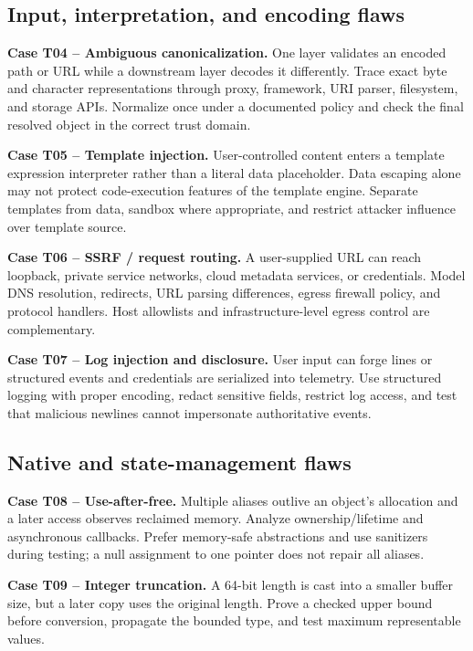 \documentclass[
  letterpaper,
]{article}
\begin{document}
\subsection{Input, interpretation, and encoding
flaws}\label{input-interpretation-and-encoding-flaws}

\textbf{Case T04 -- Ambiguous canonicalization.} One layer validates an
encoded path or URL while a downstream layer decodes it differently.
Trace exact byte and character representations through proxy, framework,
URI parser, filesystem, and storage APIs. Normalize once under a
documented policy and check the final resolved object in the correct
trust domain.

\textbf{Case T05 -- Template injection.} User-controlled content enters
a template expression interpreter rather than a literal data
placeholder. Data escaping alone may not protect code-execution features
of the template engine. Separate templates from data, sandbox where
appropriate, and restrict attacker influence over template source.

\textbf{Case T06 -- SSRF / request routing.} A user-supplied URL can
reach loopback, private service networks, cloud metadata services, or
credentials. Model DNS resolution, redirects, URL parsing differences,
egress firewall policy, and protocol handlers. Host allowlists and
infrastructure-level egress control are complementary.

\textbf{Case T07 -- Log injection and disclosure.} User input can forge
lines or structured events and credentials are serialized into
telemetry. Use structured logging with proper encoding, redact sensitive
fields, restrict log access, and test that malicious newlines cannot
impersonate authoritative events.

\subsection{Native and state-management
flaws}\label{native-and-state-management-flaws}

\textbf{Case T08 -- Use-after-free.} Multiple aliases outlive an
object's allocation and a later access observes reclaimed memory.
Analyze ownership/lifetime and asynchronous callbacks. Prefer
memory-safe abstractions and use sanitizers during testing; a null
assignment to one pointer does not repair all aliases.

\textbf{Case T09 -- Integer truncation.} A 64-bit length is cast into a
smaller buffer size, but a later copy uses the original length. Prove a
checked upper bound before conversion, propagate the bounded type, and
test maximum representable values.
\end{document}
